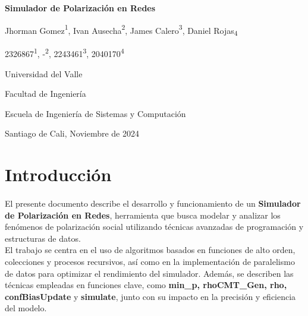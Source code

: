 \documentclass{article}
\begin{document}
  \begin{titlepage}
    \centering
    \vspace*{2cm}
    
    \Huge
    \textbf{Simulador de Polarización en Redes}
    
    \vspace{1.5cm}
    
    \Large
    Jhorman Gomez{\textsuperscript{1}}, Ivan Ausecha{\textsuperscript{2}}, James Calero{\textsuperscript{3}}, Daniel Rojas{\textsubscript{4}}
    
    \vspace{0.5cm}
    
    \large

    2326867{\textsuperscript{1}}, -{\textsuperscript{2}}, 2243461{\textsuperscript{3}}, 2040170{\textsuperscript{4}}
   
    
    \vspace{0.5cm}
    
    \Large
    Universidad del Valle
    
    \vspace{0.5cm}
    
    \large
    Facultad de Ingeniería
    
    \vspace{0.5cm}
    
    \large
    Escuela de Ingeniería de Sistemas y Computación
    
    \vspace{0.5cm}
    
    \large
    Santiago de Cali, Noviembre de 2024
    
  \end{titlepage}
\section{Introducción}

\paragraph{}
El presente documento describe el desarrollo y funcionamiento de un \textbf{Simulador de Polarización en Redes}, herramienta que busca modelar y analizar los fenómenos de polarización social utilizando técnicas avanzadas de programación y estructuras de datos. 
\\

El trabajo se centra en el uso de algoritmos basados en funciones de alto orden, colecciones y procesos recursivos, así como en la implementación de paralelismo de datos para optimizar el rendimiento del simulador. Además, se describen las técnicas empleadas en funciones clave, como \textbf{min\_p, rhoCMT\_Gen, rho, confBiasUpdate} y \textbf{simulate}, junto con su impacto en la precisión y eficiencia del modelo.
\\
\end{document}
